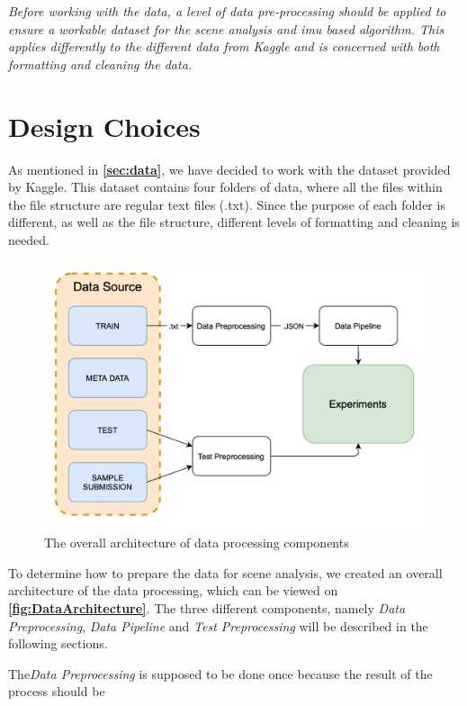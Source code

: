 \textit{Before working with the data, a level of data pre-processing should be applied to ensure a workable dataset for the scene analysis and \gls{imu} based algorithm. This applies differently to the different data from Kaggle and is concerned with both formatting and cleaning the data.}

\section{Design Choices}
As mentioned in \textbf{\autoref{sec:data}}, we have decided to work with the dataset provided by Kaggle. This dataset contains four folders of data, where all the files within the file structure are regular text files (.txt). Since the purpose of each folder is different, as well as the file structure, different levels of formatting and cleaning is needed.

\begin{figure}[H]
    \centering
    \includegraphics[scale=0.35]{Images/DataStandard/DataFlow.png}
    \caption{The overall architecture of data processing components}
    \label{fig:DataArchitecture}
\end{figure}

To determine how to prepare the data for scene analysis, we created an overall architecture of the data processing, which can be viewed on \textbf{\autoref{fig:DataArchitecture}}. The three different components, namely \textit{Data Preprocessing}, \textit{Data Pipeline} and \textit{Test Preprocessing} will be described in the following sections. 

The\textit{Data Preprocessing} is supposed to be done once because the result of the process should be 

